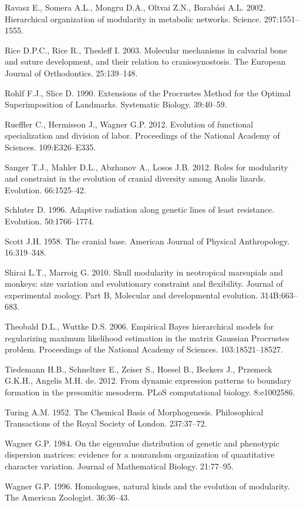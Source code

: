 \documentclass[12pt,]{article}
\begin{document}
Ravasz E., Somera A.L., Mongru D.A., Oltvai Z.N., Barabási A.L. 2002.
Hierarchical organization of modularity in metabolic networks. Science.
297:1551--1555.

Rice D.P.C., Rice R., Thesleff I. 2003. Molecular mechanisms in
calvarial bone and suture development, and their relation to
craniosynostosis. The European Journal of Orthodontics. 25:139--148.

Rohlf F.J., Slice D. 1990. Extensions of the Procrustes Method for the
Optimal Superimposition of Landmarks. Systematic Biology. 39:40--59.

Rueffler C., Hermisson J., Wagner G.P. 2012. Evolution of functional
specialization and division of labor. Proceedings of the National
Academy of Sciences. 109:E326--E335.

Sanger T.J., Mahler D.L., Abzhanov A., Losos J.B. 2012. Roles for
modularity and constraint in the evolution of cranial diversity among
Anolis lizards. Evolution. 66:1525--42.

Schluter D. 1996. Adaptive radiation along genetic lines of least
resistance. Evolution. 50:1766--1774.

Scott J.H. 1958. The cranial base. American Journal of Physical
Anthropology. 16:319--348.

Shirai L.T., Marroig G. 2010. Skull modularity in neotropical marsupials
and monkeys: size variation and evolutionary constraint and flexibility.
Journal of experimental zoology. Part B, Molecular and developmental
evolution. 314B:663--683.

Theobald D.L., Wuttke D.S. 2006. Empirical Bayes hierarchical models for
regularizing maximum likelihood estimation in the matrix Gaussian
Procrustes problem. Proceedings of the National Academy of Sciences.
103:18521--18527.

Tiedemann H.B., Schneltzer E., Zeiser S., Hoesel B., Beckers J.,
Przemeck G.K.H., Angelis M.H. de. 2012. From dynamic expression patterns
to boundary formation in the presomitic mesoderm. PLoS computational
biology. 8:e1002586.

Turing A.M. 1952. The Chemical Basis of Morphogenesis. Philosophical
Transactions of the Royal Society of London. 237:37--72.

Wagner G.P. 1984. On the eigenvalue distribution of genetic and
phenotypic dispersion matrices: evidence for a nonrandom organization of
quantitative character variation. Journal of Mathematical Biology.
21:77--95.

Wagner G.P. 1996. Homologues, natural kinds and the evolution of
modularity. The American Zoologist. 36:36--43.
\end{document}
